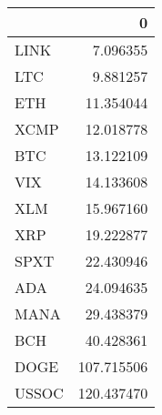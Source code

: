 \begin{tabular}{lr}
\toprule
 & 0 \\
\midrule
LINK & 7.096355 \\
LTC & 9.881257 \\
ETH & 11.354044 \\
XCMP & 12.018778 \\
BTC & 13.122109 \\
VIX & 14.133608 \\
XLM & 15.967160 \\
XRP & 19.222877 \\
SPXT & 22.430946 \\
ADA & 24.094635 \\
MANA & 29.438379 \\
BCH & 40.428361 \\
DOGE & 107.715506 \\
USSOC & 120.437470 \\
\bottomrule
\end{tabular}

